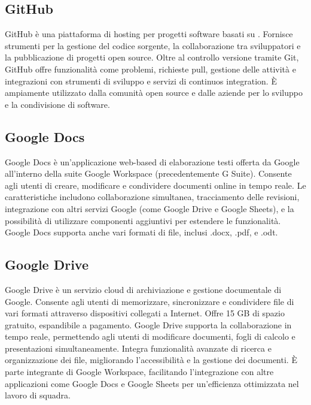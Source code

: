\vspace{2em}
\subsection*{GitHub}
\par GitHub è una piattaforma di hosting per progetti software basati su . Fornisce strumenti per la gestione del codice sorgente, la collaborazione tra sviluppatori e la pubblicazione di progetti open source. Oltre al controllo versione tramite Git, GitHub offre funzionalità come problemi, richieste pull, gestione delle attività e integrazioni con strumenti di sviluppo e servizi di continuos integration. È ampiamente utilizzato dalla comunità open source e dalle aziende per lo sviluppo e la condivisione di software.

\vspace{2em}
\subsection*{Google Docs}
\par Google Docs è un'applicazione web-based di elaborazione testi offerta da Google all'interno della suite Google Workspace (precedentemente G Suite). Consente agli utenti di creare, modificare e condividere documenti online in tempo reale. Le caratteristiche includono collaborazione simultanea, tracciamento delle revisioni, integrazione con altri servizi Google (come Google Drive e Google Sheets), e la possibilità di utilizzare componenti aggiuntivi per estendere le funzionalità. Google Docs supporta anche vari formati di file, inclusi .docx, .pdf, e .odt.

\vspace{2em}
\subsection*{Google Drive}
\par Google Drive è un servizio cloud di archiviazione e gestione documentale di Google. Consente agli utenti di memorizzare, sincronizzare e condividere file di vari formati attraverso dispositivi collegati a Internet. Offre 15 GB di spazio gratuito, espandibile a pagamento. Google Drive supporta la collaborazione in tempo reale, permettendo agli utenti di modificare documenti, fogli di calcolo e presentazioni simultaneamente. Integra funzionalità avanzate di ricerca e organizzazione dei file, migliorando l'accessibilità e la gestione dei documenti. È parte integrante di Google Workspace, facilitando l'integrazione con altre applicazioni come Google Docs e Google Sheets per un'efficienza ottimizzata nel lavoro di squadra.

